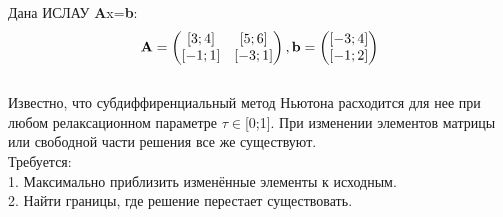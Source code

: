 \documentclass[../body.tex]{subfiles}
\begin{document}
Дана ИСЛАУ \textbf{A}x=\textbf{b}:
\begin{equation}
	   \\\textbf{A} = \begin{pmatrix}
        [3;4]& [5;6]\\
        [-1;1]& [-3;1]
        \end{pmatrix}, \textbf{b} = \begin{pmatrix}
        [-3;4]\\
        [-1;2]
        \end{pmatrix}
        \label{SLAU}
	\end{equation}
\\Известно, что субдиффиренциальный метод Ньютона расходится для нее при любом релаксационном параметре $\tau\in$[0;1]. При изменении элементов матрицы или свободной части решения все же существуют.
\\Требуется:
\\1. Максимально приблизить изменённые элементы к исходным.
\\2. Найти границы, где решение перестает существовать.
\end{document}
